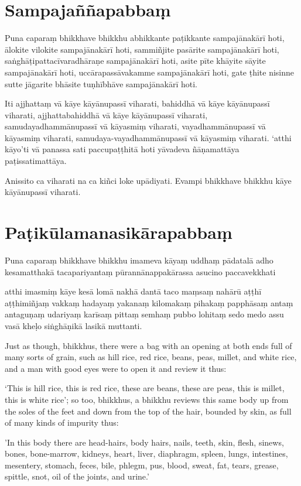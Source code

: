 \paliPage
\section*{Sampajaññapabbaṃ}

Puna caparaṃ bhikkhave bhikkhu abhikkante paṭikkante sampajānakārī hoti, ālokite
vilokite sampajānakārī hoti, sammiñjite pasārite sampajānakārī hoti,
saṅghāṭipattacīvaradhāraṇe sampajānakārī hoti, asite pīte khāyite sāyite
sampajānakārī hoti, uccārapassāvakamme sampajānakārī hoti, gate ṭhite nisinne
sutte jāgarite bhāsite tuṇhībhāve sampajānakārī hoti.

Iti ajjhattaṃ vā kāye kāyānupassī viharati, bahiddhā vā kāye kāyānupassī
viharati, ajjhattabahiddhā vā kāye kāyānupassī viharati, samudayadhammānupassī
vā kāyasmiṃ viharati, vayadhammānupassī vā kāyasmiṃ viharati,
samudaya-vayadhammānupassī vā kāyasmiṃ viharati. `atthi kāyo'ti vā panassa sati
paccupaṭṭhitā hoti yāvadeva ñāṇamattāya paṭissatimattāya.

Anissito ca viharati na ca kiñci loke upādiyati. Evampi bhikkhave bhikkhu kāye
kāyānupassī viharati.


\section*{Paṭikūlamanasikārapabbaṃ}

Puna caparaṃ bhikkhave bhikkhu imameva kāyaṃ uddhaṃ pādatalā adho kesamatthakā
tacapariyantaṃ pūrannānappakārassa asucino paccavekkhati

atthi imasmiṃ kāye kesā lomā nakhā dantā taco maṃsaṃ nahārū aṭṭhī aṭṭhimiñjaṃ
vakkaṃ hadayaṃ yakanaṃ kilomakaṃ pihakaṃ papphāsaṃ antaṃ antaguṇaṃ udariyaṃ
karīsaṃ pittaṃ semhaṃ pubbo lohitaṃ sedo medo assu vasā kheḷo siṅghāṇikā lasikā
muttanti.

\englishPage

Just as though, bhikkhus, there were a bag with an opening at both ends full of
many sorts of grain, such as hill rice, red rice, beans, peas, millet, and white
rice, and a man with good eyes were to open it and review it thus:

‘This is hill rice, this is red rice, these are beans, these are peas, this is
millet, this is white rice’; so too, bhikkhus, a bhikkhu reviews this same body
up from the soles of the feet and down from the top of the hair, bounded by
skin, as full of many kinds of impurity thus:

'In this body there are head-hairs, body hairs, nails, teeth, skin, flesh,
sinews, bones, bone-marrow, kidneys, heart, liver, diaphragm, spleen, lungs,
intestines, mesentery, stomach, feces, bile, phlegm, pus, blood, sweat, fat,
tears, grease, spittle, snot, oil of the joints, and urine.'

